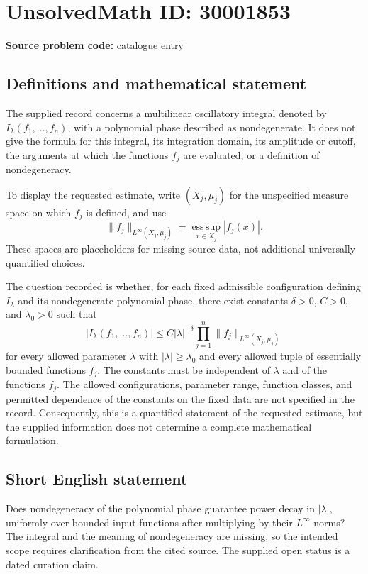 \documentclass[11pt]{article}
\begin{document}
\section*{UnsolvedMath ID: 30001853}
\textbf{Source problem code:} catalogue entry
\subsection{Definitions and mathematical statement}
The supplied record concerns a multilinear oscillatory integral denoted by \(I_\lambda(f_1,\ldots,f_n)\), with a polynomial phase described as nondegenerate. It does not give the formula for this integral, its integration domain, its amplitude or cutoff, the arguments at which the functions \(f_j\) are evaluated, or a definition of nondegeneracy.

To display the requested estimate, write \((X_j,\mu_j)\) for the unspecified measure space on which \(f_j\) is defined, and use
\[
\|f_j\|_{L^\infty(X_j,\mu_j)}
=\operatorname*{ess\,sup}_{x\in X_j}|f_j(x)|.
\]
These spaces are placeholders for missing source data, not additional universally quantified choices.

The question recorded is whether, for each fixed admissible configuration defining \(I_\lambda\) and its nondegenerate polynomial phase, there exist constants \(\delta>0\), \(C>0\), and \(\lambda_0>0\) such that
\[
\bigl|I_\lambda(f_1,\ldots,f_n)\bigr|
\le C|\lambda|^{-\delta}
\prod_{j=1}^{n}\|f_j\|_{L^\infty(X_j,\mu_j)}
\]
for every allowed parameter \(\lambda\) with \(|\lambda|\ge\lambda_0\) and every allowed tuple of essentially bounded functions \(f_j\). The constants must be independent of \(\lambda\) and of the functions \(f_j\). The allowed configurations, parameter range, function classes, and permitted dependence of the constants on the fixed data are not specified in the record. Consequently, this is a quantified statement of the requested estimate, but the supplied information does not determine a complete mathematical formulation.
\subsection{Short English statement}
Does nondegeneracy of the polynomial phase guarantee power decay in \(|\lambda|\), uniformly over bounded input functions after multiplying by their \(L^\infty\) norms? The integral and the meaning of nondegeneracy are missing, so the intended scope requires clarification from the cited source. The supplied open status is a dated curation claim.
\end{document}
